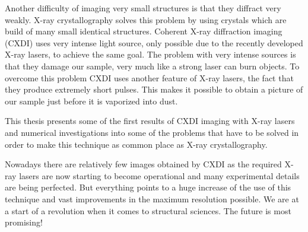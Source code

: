 Another difficulty of imaging very small structures is that they diffract very
weakly. X-ray crystallography solves this problem by using crystals which are
build of many small identical structures. Coherent X-ray diffraction imaging (CXDI)
uses very intense light source, only possible due to the recently developed X-ray
lasers, to achieve the same goal. The problem with very intense
sources is that they damage our sample, very much like a strong laser can burn
objects. To overcome this problem CXDI uses another feature of X-ray
lasers, the fact that they produce extremely short pulses. This makes it
possible to obtain a picture of our sample just before it is vaporized into
dust.

This thesis presents some of the first results of CXDI imaging with X-ray lasers
and numerical investigations into some of the problems that have to be solved in
order to make this technique as common place as X-ray crystallography.

Nowadays there are relatively few images obtained by CXDI as the required X-ray
lasers are now starting to become operational and many experimental details are
being perfected. But everything points to a huge increase of the use of this
technique and vast improvements in the maximum resolution possible. We are at a
start of a revolution when it comes to structural sciences.  
The future is most promising!
